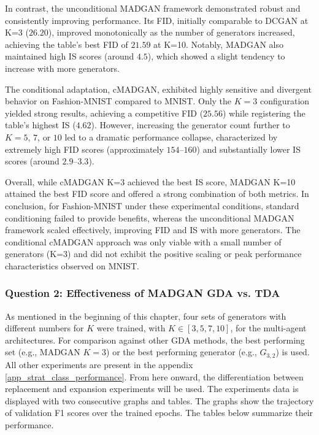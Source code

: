 In contrast, the unconditional MADGAN framework demonstrated robust and consistently improving performance. Its FID, initially comparable to DCGAN at K=3 ($26.20$), improved monotonically as the number of generators increased, achieving the table's best FID of $21.59$ at K=10. Notably, MADGAN also maintained high IS scores (around $4.5$), which showed a slight tendency to increase with more generators.

The conditional adaptation, cMADGAN, exhibited highly sensitive and divergent behavior on Fashion-MNIST compared to MNIST. Only the $K = 3$ configuration yielded strong results, achieving a competitive FID ($25.56$) while registering the table's highest IS ($4.62$). However, increasing the generator count further to $K = 5$, $7$, or $10$ led to a dramatic performance collapse, characterized by extremely high FID scores (approximately $154$–$160$) and substantially lower IS scores (around $2.9$–$3.3$).

Overall, while cMADGAN K=3 achieved the best IS score, MADGAN K=10 attained the best FID score and offered a strong combination of both metrics. In conclusion, for Fashion-MNIST under these experimental conditions, standard conditioning failed to provide benefits, whereas the unconditional MADGAN framework scaled effectively, improving FID and IS with more generators. The conditional cMADGAN approach was only viable with a small number of generators (K=3) and did not exhibit the positive scaling or peak performance characteristics observed on MNIST.

\subsubsection[Question 2]{Question 2: Effectiveness of MADGAN GDA vs. TDA}\label{exp_results_ans_q2}
 As mentioned in the beginning of this chapter, four sets of generators with different numbers for \(K\) were trained, with \(K \in [3, 5, 7, 10]\), for the multi-agent architectures. For comparison against other GDA methods, the best performing set (e.g., MADGAN \(K=3\)) or the best performing generator (e.g., \(G_{3,2}\)) is used. All other experiments are present in the appendix \ref{app_strat_class_performance}. From here onward, the differentiation between replacement and expansion experiments will be used. The experiments data is displayed with two consecutive graphs and tables. The graphs show the trajectory of validation F1 scores over the trained epochs. The tables below summarize their performance.


